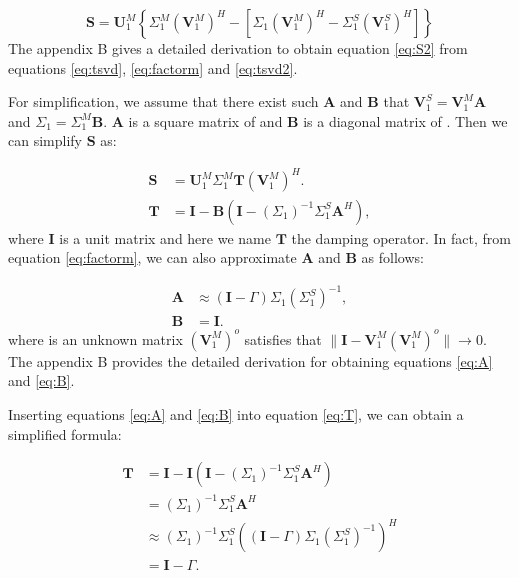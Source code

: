\begin{equation}
\label{eq:S2}
\mathbf{S}=\mathbf{U}_1^M\left\{\Sigma_1^M(\mathbf{V}_1^M)^H- \left[\Sigma_1(\mathbf{V}_1^M)^H-\Sigma_1^S(\mathbf{V}_1^S)^H\right]\right\}
\end{equation}
The appendix B gives a detailed derivation to obtain equation \ref{eq:S2} from equations \ref{eq:tsvd}, \ref{eq:factorm} and \ref{eq:tsvd2}.

For simplification, we assume that there exist such $\mathbf{A}$ and $\mathbf{B}$ that $\mathbf{V}_1^S=\mathbf{V}_1^M\mathbf{A}$ and $\Sigma_1= \Sigma_1^M\mathbf{B}$. $\mathbf{A}$ is a square matrix of  and $\mathbf{B}$ is a diagonal matrix of . Then we can simplify $\mathbf{S}$ as:

\begin{align}
\label{eq:S3}
\mathbf{S} &= \mathbf{U}_1^M\Sigma_1^M\mathbf{T}\left(\mathbf{V}_1^M\right)^H.\\
\label{eq:T}
\mathbf{T} &= \mathbf{I} - \mathbf{B}\left(\mathbf{I}-(\Sigma_1)^{-1}\Sigma_1^S\mathbf{A}^H\right),
\end{align}
where $\mathbf{I}$ is a unit matrix and here we name $\mathbf{T}$ the damping operator. In fact, from equation \ref{eq:factorm}, we can also approximate $\mathbf{A}$ and $\mathbf{B}$ as follows:

\begin{align}
\label{eq:A}
\mathbf{A}&\approx(\mathbf{I}-\Gamma)\Sigma_1\left(\Sigma_1^S\right)^{-1},\\
\label{eq:B}
\mathbf{B} &=\mathbf{I}.
\end{align}
where   is an unknown matrix $(\mathbf{V}_1^M)^{o}$ satisfies that $\parallel\mathbf{I}-\mathbf{V}_1^M(\mathbf{V}_1^M)^{o} \parallel\rightarrow 0$. The appendix B provides the detailed derivation for obtaining equations \ref{eq:A} and \ref{eq:B}.

Inserting equations \ref{eq:A} and \ref{eq:B} into equation \ref{eq:T}, we can obtain a simplified formula:

\begin{equation}
\label{eq:T1}
\begin{split}
\mathbf{T} &= \mathbf{I} - \mathbf{I}\left(\mathbf{I}-(\Sigma_1)^{-1}\Sigma_1^S\mathbf{A}^H\right)\\
		 &= (\Sigma_1)^{-1}\Sigma_1^S\mathbf{A}^H \\
		 &\approx(\Sigma_1)^{-1}\Sigma_1^S  \left((\mathbf{I}-\Gamma)\Sigma_1\left(\Sigma_1^S\right)^{-1}\right)^H \\
		 &=\mathbf{I}-\Gamma.
\end{split}		 
\end{equation}

